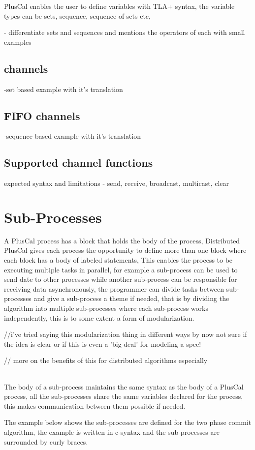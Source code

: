 \documentclass{thesul}
\begin{document}
PlusCal enables the user to define variables with TLA+ syntax, the variable types can be sets, sequence, sequence of sets etc, 

- differentiate sets and sequences and mentions the operators of each with small examples


\subsection{channels}
-set based 
example with it's translation
\subsection{FIFO channels}
-sequence based
example with it's translation
\subsection{Supported channel functions}
expected syntax and limitations
- send, receive, broadcast, multicast, clear
\section{Sub-Processes}

A PlusCal process has a block that holds the body of the process, Distributed PlusCal gives each process the opportunity to define more than one block where each block has a body of labeled statements, This enables the process to be executing multiple tasks in parallel, for example a sub-process can be used to send date to other processes while another sub-process can be responsible for receiving data asynchronously, the programmer can divide tasks between sub-processes and give a sub-process a theme  if needed, that is by dividing the algorithm into multiple sub-processes where each sub-process works independently, this is to some extent a form of modularization.

//i've tried saying this modularization thing in different ways by now not sure if the idea is clear or if this is even a 'big deal' for modeling a spec!

// more on the benefits of this for distributed algorithms especially

\hfill\\
The body of a sub-process maintains the same syntax as the body of a PlusCal process, all the sub-processes share the same variables declared for the process, this makes communication between them possible if needed.

The example below shows the sub-processes are defined for the two phase commit algorithm, the example is written in c-syntax and the sub-processes are surrounded by curly braces.
\end{document}
